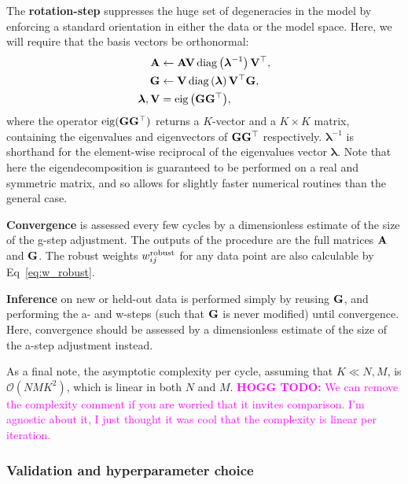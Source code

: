 \documentclass[onecolumn,floatfix]{aastex631}
\DeclareMathOperator{\eig}{eig}
\newcommand{\hoggtodo}[1]{\textcolor{magenta}{\textbf{HOGG TODO:} #1}}
\begin{document}
The \textbf{rotation-step} suppresses the huge set of degeneracies in the model by enforcing a standard orientation in either the data or the model space. Here, we will require that the basis vectors be orthonormal:
\begin{align}
    {\bf A} &\leftarrow {\bf A} {\bf V} \, {\rm diag} \left(\boldsymbol{\lambda}^{-1}\right) {\bf V}^\top, \\
    {\bf G} &\leftarrow {\bf V} \, {\rm diag} \left(\boldsymbol{\lambda}\right) {\bf V}^\top {\bf G}, \\
    \boldsymbol{\lambda}, {\bf V} &= \eig{\left( {\bf G} {\bf G}^\top \right)},
\end{align}
where the operator ${\rm eig}({\bf G} {\bf G}^\top)$ returns a $K$-vector and a $K\times K$ matrix, containing the eigenvalues and eigenvectors of ${\bf G} {\bf G}^\top$ respectively.
$\boldsymbol{\lambda}^{-1}$ is shorthand for the element-wise reciprocal of the eigenvalues vector $\boldsymbol{\lambda}$.
Note that here the eigendecomposition is guaranteed to be performed on a real and symmetric matrix, and so allows for slightly faster numerical routines than the general case.

\textbf{Convergence} is assessed every few cycles by a dimensionless estimate of the size of the g-step adjustment.
The outputs of the procedure are the full matrices ${\bf A}$ and ${\bf G}$.
The robust weights $w^{\rm robust}_{ij}$ for any data point are also calculable by Eq~\eqref{eq:w_robust}.

\textbf{Inference} on new or held-out data is performed simply by reusing ${\bf G}$, and performing the a- and w-steps (such that ${\bf G}$ is never modified) until convergence.
Here, convergence should be assessed by a dimensionless estimate of the size of the a-step adjustment instead.

As a final note, the asymptotic complexity per cycle, assuming that $K \ll N, M$, is $\mathcal{O}(NMK^2)$, which is linear in both $N$ and $M$.
\hoggtodo{We can remove the complexity comment if you are worried that it invites comparison. I'm agnostic about it, I just thought it was cool that the complexity is linear per iteration.}

\subsubsection{Validation and hyperparameter choice} \label{sec:cv}
\end{document}
